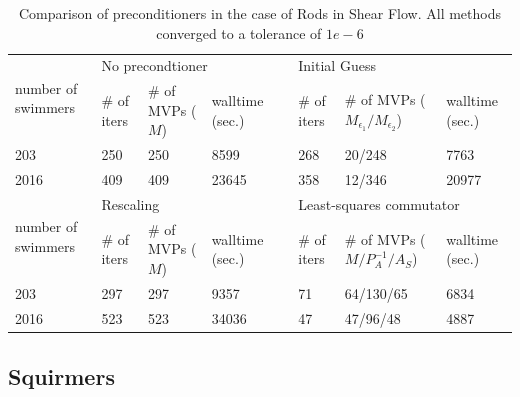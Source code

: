 \begin{table}[htbp]
\begin{singlespace}
\centering
\setlength{\tabcolsep}{6pt}
\renewcommand{\arraystretch}{1.4}
\small
\begin{tabular}{p{2cm} p{1cm} p{2cm} p{1.5cm} p{0.1cm} p{1cm} p{2cm} p{1.5cm}}
\multirow{2}{*}{\parbox{1.8cm}{number of swimmers}} & \multicolumn{3}{l}{No precondtioner} & & \multicolumn{3}{l}{Initial Guess} \\ \cline{2-4} \cline{6-8}
  & \# of iters & \# of MVPs ($M$) & walltime (sec.) & & \# of iters & \# of MVPs ($M_{\epsilon_1}/M_{\epsilon_2}$) & walltime (sec.) \\ \hline
  203 & 250 & 250 & 8599 & &  268 & 20/248 & 7763\\
  2016 & 409 & 409 & 23645 & & 358 & 12/346 & 20977\\ \hline
  \multirow{2}{*}{\parbox{1.8cm}{number of swimmers}} & \multicolumn{3}{l}{Rescaling} & &\multicolumn{3}{l}{Least-squares commutator} \\ \cline{2-4} \cline{6-8}
  & \# of iters & \# of MVPs ($M$) & walltime (sec.) & & \# of iters & \# of MVPs ($M/P_A^{-1}/A_S$) & walltime (sec.) \\ \hline
  203 & 297 & 297 & 9357 & & 71 & 64/130/65 & 6834 \\
  2016 & 523 & 523 & 34036 & & 47 & 47/96/48 & 4887 
\end{tabular}
\label{tab:Preconditioning}
\caption{Comparison of preconditioners in the case of Rods in Shear Flow. All methods converged to a tolerance of $1e-6$}
\end{singlespace}
\end{table}

\subsection{Squirmers}

